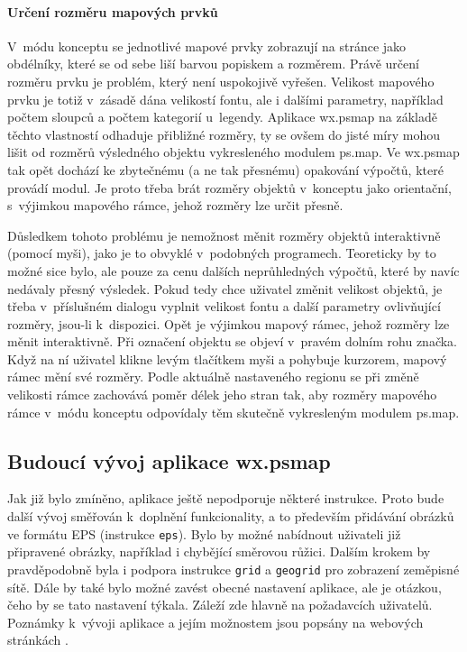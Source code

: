 \documentclass[a4paper,12pt,draft]{article}
\newcommand{\instr}[1]{\lstinline[style=psmapInline]|#1|}
\begin{document}
 \paragraph*{Určení rozměru mapových prvků}
 V~módu konceptu se jednotlivé mapové prvky zobrazují na
 stránce jako obdélníky, které se od sebe liší barvou popiskem
 a rozměrem. Právě určení rozměru prvku je problém, který není
 uspokojivě vyřešen. Velikost mapového prvku je totiž v~zásadě dána
 velikostí fontu, ale i dalšími parametry, například počtem sloupců
 a počtem kategorií u~legendy. Aplikace wx.psmap na základě těchto
 vlastností odhaduje přibližné rozměry, ty se ovšem do jisté míry
 mohou lišit od rozměrů výsledného objektu vykresleného modulem
 ps.map. Ve wx.psmap tak opět dochází ke zbytečnému (a ne
 tak přesnému) opakování výpočtů, které provádí modul. Je proto třeba brát
 rozměry objektů v~konceptu  jako orientační, s~výjimkou
 mapového rámce, jehož rozměry lze určit přesně.

 Důsledkem tohoto problému je nemožnost měnit rozměry objektů
 interaktivně (pomocí myši), jako je to obvyklé v~podobných
 programech. Teoreticky by to možné sice bylo, ale pouze za cenu
 dalších neprůhledných výpočtů, které by navíc nedávaly přesný
 výsledek. Pokud tedy chce uživatel změnit velikost objektů, je třeba
 v~přísluš\-ném dialogu vyplnit velikost fontu a další parametry
 ovlivňující rozměry, jsou-li k~dispozici. Opět je výjimkou mapový
 rámec, jehož rozměry lze měnit interaktivně. Při označení objektu
 se objeví v~pravém dolním rohu značka. Když na ní uživatel klikne levým
tlačítkem myši a pohybuje kurzorem, mapový rámec mění své rozměry. Podle
aktuálně nastaveného regionu se při změně velikosti rámce zachovává poměr délek
jeho stran tak, aby rozměry mapového rámce v~módu konceptu odpovídaly těm
skutečně vykresleným modulem ps.map.


\subsection{Budoucí vývoj aplikace wx.psmap}
\label{sec:gui:future}
Jak již bylo zmíněno, aplikace ještě nepodporuje některé  instrukce.
Proto bude další vývoj směřován k~doplnění funkcionality, a to především
přidávání obrá\-zků ve formátu EPS (instrukce \instr{eps}). Bylo by možné
nabídnout uživateli již připra\-vené obrázky, například i chybějící
směrovou růžici. Dalším krokem by pravděpo\-dobně byla i podpora instrukce
\instr{grid} a \instr{geogrid} pro zobrazení zeměpisné sítě.
Dále by také bylo možné zavést obecné nastavení aplikace, ale je otázkou, čeho
by se tato nastavení týkala. Záleží zde hlavně na požadavcích uživatelů.
Poznámky k~vývoji aplikace a jejím možnostem jsou popsány na webových stránkách
\cite{trac_wxpsmap}.
\end{document}
